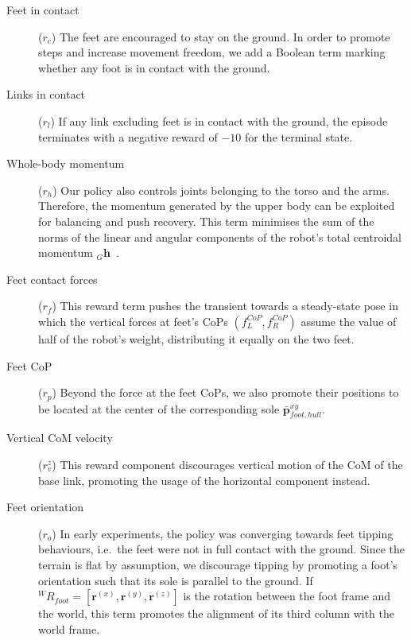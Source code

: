 \begin{description}

\item[Feet in contact]\!($r_c$)\;
%
The feet are encouraged to stay on the ground.
In order to promote steps and increase movement freedom, we add a Boolean term marking whether any foot is in contact with the ground.

\item[Links in contact]\!($r_l$)\;
%
If any link excluding feet is in contact with the ground, the episode terminates with a negative reward of $-10$ for the terminal state.

\item[Whole-body momentum]\!($r_h$)\;
%
Our policy also controls joints belonging to the torso and the arms.
Therefore, the momentum generated by the upper body can be exploited for balancing and push recovery.
This term minimises the sum of the norms of the linear and angular components of the robot's total centroidal momentum ${}_G \mathbf{h}$~\parencite{traversaro_unied_2017}.

\item[Feet contact forces]\!($r_f$)\;
%
This reward term pushes the transient towards a steady-state pose in which the vertical forces at feet's \acp{CoP} $(f^{CoP}_L, f^{CoP}_R)$ assume the value of half of the robot's weight, distributing it equally on the two feet.

\item[Feet CoP]\!($r_p$)\;
%
Beyond the force at the feet \acp{CoP}, we also promote their positions to be located at the center of the corresponding sole $\bar{\boldsymbol{p}}^{xy}_{foot, hull}$.

\item[Vertical CoM velocity]\!($r_{v}^z$)\;
%
This reward component discourages vertical motion of the \ac{CoM} of the base link, promoting the usage of the horizontal component instead.

\item[Feet orientation]\!($r_o$)\;
%
In early experiments, the policy was converging towards feet tipping behaviours, i.e.\ the feet were not in full contact with the ground.
Since the terrain is flat by assumption, we discourage tipping by promoting a foot's orientation such that its sole is parallel to the ground.
If ${}^W R_{foot} = [\mathbf{r}^{(x)}, \mathbf{r}^{(y)}, \mathbf{r}^{(z)}]$ is the rotation between the foot frame and the world, this term promotes the alignment of its third column with the world frame.

\end{description}


